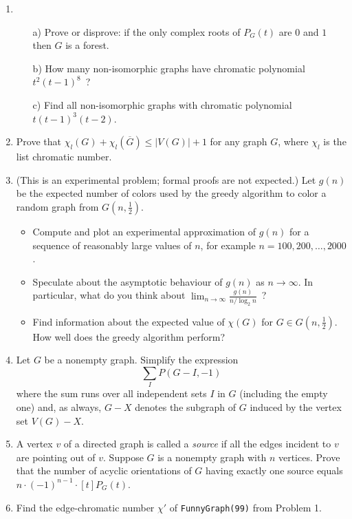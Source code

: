 \begin{enumerate}
\item
\begin{itemize}
\item[a)] Prove or disprove: if the only complex roots of $P_G(t)$ are $0$ and $1$ then $G$ is a forest.
\item[b)] How many non-isomorphic graphs have chromatic polynomial $t^2(t-1)^8$\ ?
\item[c)] Find all non-isomorphic graphs with chromatic polynomial $t(t-1)^3(t-2)$.
\end{itemize}


\item Prove that $\chi_l(G)+\chi_l(\overline{G})\leq |V(G)|+1$ for any graph $G$, where $\chi_l$ is the list chromatic number.


\item 
(This is an experimental problem; formal proofs are not expected.) Let $g(n)$ be the expected number of colors used by the greedy algorithm to color a random graph from $G(n,\frac12)$. 
\begin{itemize}
\item Compute and plot an experimental approximation of $g(n)$ for a sequence of reasonably large values of $n$, for example $n=100,200,\ldots,2000$.
\item Speculate about the asymptotic behaviour of $g(n)$ as $n\to\infty$. In particular, what do you think about $\lim_{n\to\infty}\frac{g(n)}{n/\log_2{n}}$\ ?
\item Find information about the expected value of $\chi(G)$ for $G\in G(n,\frac12)$. How well does the greedy algorithm perform?
\end{itemize}


\item Let $G$ be a nonempty graph. Simplify the expression
$$\sum_I P(G-I, -1)$$
where the sum runs over all independent sets $I$ in $G$ (including the empty one) and, as always, $G-X$ denotes the subgraph of $G$ induced by the vertex set $V(G)- X$.


\item A vertex $v$ of a directed graph is called a \emph{source} if all the edges incident to $v$ are pointing out of $v$. Suppose $G$ is a nonempty graph with $n$ vertices. Prove that the number of acyclic orientations of $G$ having exactly one source equals $n\cdot (-1)^{n-1}\cdot [t]P_G(t)$.


\item Find the edge-chromatic number $\chi'$ of \texttt{FunnyGraph(99)} from Problem 1.



\end{enumerate}

